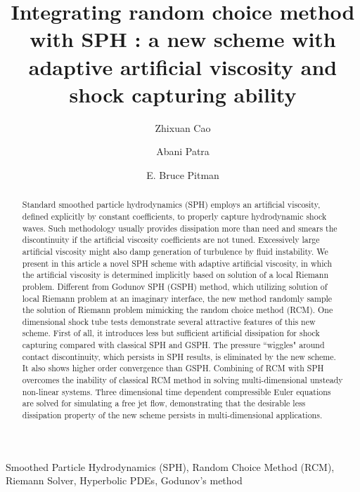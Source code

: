 \documentclass[review]{elsarticle}
\begin{document}
\begin{frontmatter}
\title{Integrating random choice method with SPH : a new scheme with adaptive artificial viscosity and shock capturing ability}
\author{Zhixuan Cao}
\author{Abani Patra }
\address{Department of Mechanical and Aerospace Engineering,The State University of New York at Buffalo, Amherst, NY, 14260-4200, USA}
\author{E. Bruce Pitman}
\address{Department of Materials Design and Innovation, The State University of New York at Buffalo, Amherst, NY, 14260-4200, USA}
\begin{abstract}
Standard smoothed particle hydrodynamics (SPH) employs an artificial viscosity, defined explicitly by constant coefficients, to properly capture hydrodynamic shock waves.
Such methodology usually provides dissipation more than need and smears the discontinuity if the artificial viscosity coefficients are not tuned.
Excessively large artificial viscosity might also damp generation of turbulence by fluid instability.
We present in this article a novel SPH scheme with adaptive artificial viscosity, in which the artificial viscosity is determined implicitly based on solution of a local Riemann problem. Different from Godunov SPH (GSPH) method, which utilizing solution of local Riemann problem at an imaginary interface, the new method randomly sample the solution of Riemann problem mimicking the random choice method (RCM). One dimensional shock tube tests demonstrate several attractive features of this new scheme. First of all, it introduces less but sufficient artificial dissipation for shock capturing compared with classical SPH and GSPH. The pressure ``wiggles" around contact discontinuity, which persists in SPH results, is eliminated by the new scheme. It also shows higher order convergence than GSPH.
Combining of RCM with SPH overcomes the inability of classical RCM method in solving multi-dimensional unsteady non-linear systems. Three dimensional time dependent compressible Euler equations are solved for simulating a free jet flow, demonstrating that the desirable less dissipation property of the new scheme persists in multi-dimensional applications.
\end{abstract}
\begin{keyword}
Smoothed Particle Hydrodynamics (SPH), Random Choice Method (RCM), Riemann Solver, Hyperbolic PDEs, Godunov's method
\end{keyword}
\end{frontmatter}
\end{document}
